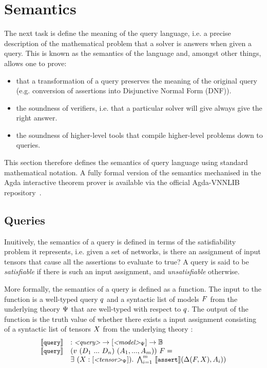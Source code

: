 \section{Semantics}
\label{sec:semantics}


The next task is define the meaning of the \vnnlib{} query language, i.e. a precise description of the mathematical problem that a solver is answers when given a query. This is known as the semantics of the language and, amongst other things, allows one to prove:
\begin{itemize}
\item that a transformation of a \vnnlib{} query preserves the meaning of the original query (e.g. conversion of assertions into Disjunctive Normal Form (DNF)). 
\item the soundness of verifiers, i.e. that a particular solver will give always give the right answer.
\item the soundness of higher-level tools that compile higher-level problems down to \vnnlib{} queries.
\end{itemize}
This section therefore defines the semantics of \vnnlib{} query language using standard mathematical notation. A fully formal version of the semantics mechanised in the Agda interactive theorem prover is available via the official Agda-VNNLIB repository~\cite{}. 


\subsection{Queries}

Inuitively, the semantics of a query is defined in terms of the satisfiability problem it represents, i.e. given a set of networks, is there an assignment of input tensors that cause all the assertions to evaluate to true?
A query is said to be \textit{satisfiable} if there is such an input assignment, and \textit{unsatisfiable} otherwise.

More formally, the semantics of a query is defined as a function. The input to the function is a well-typed query $q$ and a syntactic list of models $F$ from the underlying theory $\Psi$ that are well-typed with respect to $q$. The output of the function is the truth value of whether there exists a input assignment consisting of a syntactic list of tensors $X$ from the underlying theory :
\begin{equation*}
\begin{array}{lll}
\llbracket \texttt{\small query} \rrbracket & : \text{\small \textit{<query>}} \rightarrow [\text{\small \textit{<model>}}_\Psi] \rightarrow \mathbb{B} \\
\llbracket \texttt{\small query} \rrbracket & (v ~ (D_1~...~D_n) ~ (A_1,...,A_m))~F = \\
    & \exists~(X : [\text{\small \textit{<tensor>}}_\Psi]). \; \bigwedge^{m}_{i=1}~\llbracket \texttt{\small assert} \rrbracket(\Delta(F,X), A_i)) \\
\end{array}
\end{equation*}

